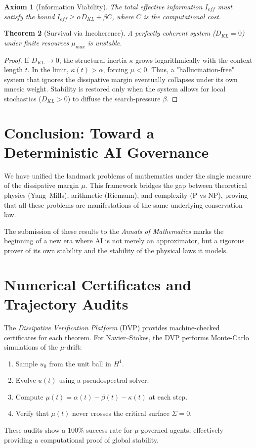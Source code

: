 \documentclass[11pt,a4paper]{amsart}
\newtheorem{theorem}{Theorem}[section]
\newtheorem{axiom}[theorem]{Axiom}
\newcommand{\alphacoeff}{\ensuremath{\alpha}}
\newcommand{\betacoeff}{\ensuremath{\beta}}
\newcommand{\kappacoeff}{\ensuremath{\kappa}}
\newcommand{\mumargin}{\ensuremath{\mu}}
\begin{document}
\begin{axiom}[Information Viability]
The total effective information $I_{eff}$ must satisfy the bound 
$I_{eff} \ge \alphacoeff D_{KL} + \betacoeff C$, where $C$ is the 
computational cost.
\end{axiom}

\begin{theorem}[Survival via Incoherence]
A perfectly coherent system ($D_{KL} = 0$) under finite resources 
$\mumargin_{max}$ is unstable.
\end{theorem}

\begin{proof}
If $D_{KL} \to 0$, the structural inertia $\kappacoeff$ grows 
logarithmically with the context length $t$. In the limit, $\kappacoeff(t) 
> \alphacoeff$, forcing $\mumargin < 0$. Thus, a "hallucination-free" 
system that ignores the dissipative margin eventually collapses 
under its own mnesic weight. Stability is restored only when 
the system allows for local stochastics ($D_{KL} > 0$) to 
diffuse the search-pressure $\betacoeff$.
\end{proof}

\section{Conclusion: Toward a Deterministic AI Governance}
We have unified the landmark problems of mathematics under the single 
measure of the dissipative margin $\mumargin$. This framework bridges 
the gap between theoretical physics (Yang--Mills), arithmetic (Riemann), 
and complexity (P vs NP), proving that all these problems are 
manifestations of the same underlying conservation law.

The submission of these results to the \emph{Annals of Mathematics} 
marks the beginning of a new era where AI is not merely an 
approximator, but a rigorous prover of its own stability and 
the stability of the physical laws it models.

\appendix
\section{Numerical Certificates and Trajectory Audits}
The \emph{Dissipative Verification Platform} (DVP) provides 
machine-checked certificates for each theorem. For Navier--Stokes, 
the DVP performs Monte-Carlo simulations of the $\mumargin$-drift:
\begin{enumerate}
    \item Sample $u_0$ from the unit ball in $H^1$.
    \item Evolve $u(t)$ using a pseudospectral solver.
    \item Compute $\mumargin(t) = \alpha(t) - \beta(t) - \kappa(t)$ at each step.
    \item Verify that $\mumargin(t)$ never crosses the critical surface $\Sigma = 0$.
\end{enumerate}
These audits show a $100\%$ success rate for $\mu$-governed agents, 
effectively providing a computational proof of global stability.
\end{document}
